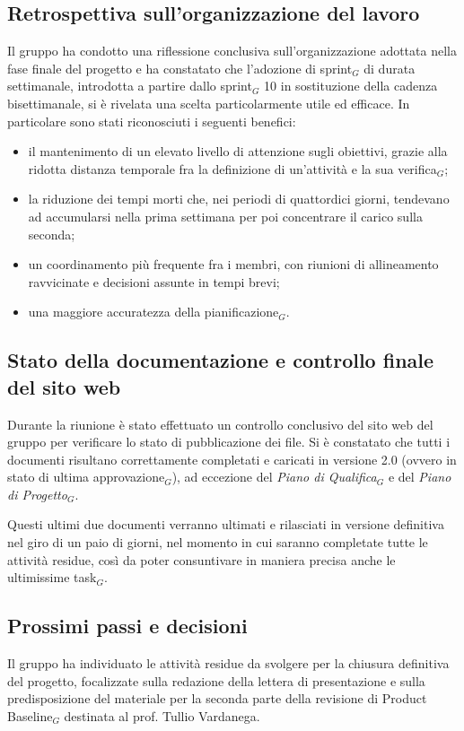 \documentclass[a4paper, 10pt, colorlinks=true, linkcolor=black, urlcolor=blue, citecolor=blue, hidelinks]{article}
\begin{document}
\subsection{Retrospettiva sull'organizzazione del lavoro}
Il gruppo ha condotto una riflessione conclusiva sull'organizzazione adottata nella fase finale del progetto e ha constatato che l'adozione di sprint$_G$ di durata settimanale, introdotta a partire dallo sprint$_G$ 10 in sostituzione della cadenza bisettimanale, si è rivelata una scelta particolarmente utile ed efficace. In particolare sono stati riconosciuti i seguenti benefici:

\begin{itemize}
    \item il mantenimento di un elevato livello di attenzione sugli obiettivi, grazie alla ridotta distanza temporale fra la definizione di un'attività e la sua verifica$_G$;
    \item la riduzione dei tempi morti che, nei periodi di quattordici giorni, tendevano ad accumularsi nella prima settimana per poi concentrare il carico sulla seconda;
    \item un coordinamento più frequente fra i membri, con riunioni di allineamento ravvicinate e decisioni assunte in tempi brevi;
    \item una maggiore accuratezza della pianificazione$_G$.
\end{itemize}

\subsection{Stato della documentazione e controllo finale del sito web}
Durante la riunione è stato effettuato un controllo conclusivo del sito web del gruppo per verificare lo stato di pubblicazione dei file. Si è constatato che tutti i documenti risultano correttamente completati e caricati in versione 2.0 (ovvero in stato di ultima approvazione$_G$), ad eccezione del \textit{Piano di Qualifica}$_G$ e del \textit{Piano di Progetto}$_G$.

\noindent Questi ultimi due documenti verranno ultimati e rilasciati in versione definitiva nel giro di un paio di giorni, nel momento in cui saranno completate tutte le attività residue, così da poter consuntivare in maniera precisa anche le ultimissime task$_G$.

\subsection{Prossimi passi e decisioni}
\label{sec:prossimi-passi}
Il gruppo ha individuato le attività residue da svolgere per la chiusura definitiva del progetto, focalizzate sulla redazione della lettera di presentazione e sulla predisposizione del materiale per la seconda parte della revisione di Product Baseline$_G$ destinata al prof. Tullio Vardanega.
\end{document}
